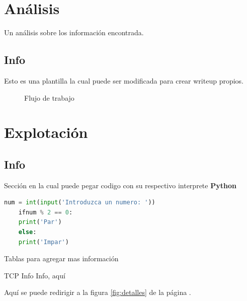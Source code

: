 \documentclass[a4paper]{article}%
\begin{document}
\begin{titlepage}
  \section{Análisis} %
   Un análisis sobre los información encontrada.
   \subsection{Info} %
   Esto es una plantilla la cual puede ser modificada para crear writeup propios.
   
   \begin{figure}[h] %
      \begin{center}
      \caption{Flujo de trabajo}
      \label{fig:diagrama}
      \end{center}
   \end{figure}
   
   \section{Explotación} %
    \subsection{Info}
    \vspace{0.1cm}
     Sección en la cual puede pegar codigo con su respectivo interprete \textbf{Python}
    \vspace{0.1cm}
    
    \begin{lstlisting}[language=Python, caption=Script personalizado para los puertos abiertos] 
    num = int(input('Introduzca un numero: '))
    ifnum % 2 == 0:
    print('Par')
    else:
    print('Impar')
    \end{lstlisting}

    \vspace{0.2cm}
    Tablas para agregar mas información

    \begin{schema}{TCP} 
       Info
       \where
       Info, aquí
    \end{schema}
    
 \vspace{0.1cm}
   
   Aquí se puede redirigir a la figura \ref{fig:detalles} de la página \pageref{fig:detalles}.
   
   
  \end{titlepage}
\end{document}

